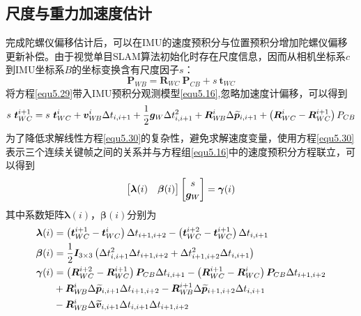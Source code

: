 \subsection{尺度与重力加速度估计}
完成陀螺仪偏移估计后，可以在IMU的速度预积分与位置预积分增加陀螺仪偏移更新补偿。由于视觉单目SLAM算法初始化时存在尺度信息，因而从相机坐标系$c$到IMU坐标系$B$的坐标变换含有尺度因子$s$：
\begin{equation}
\label{equ5.29}
\boldsymbol{P}_{W\!B} = \boldsymbol{R}_{WC}\ \boldsymbol{P}_{CB} + s\ \boldsymbol{t}_{WC} 
\end{equation}
将方程\eqref{equ5.29}带入IMU预积分观测模型\eqref{equ5.16},忽略加速度计偏移，可以得到
\begin{equation}
\label{equ5.30}
s\ \boldsymbol{t}_{WC}^{i+1} = s\ \boldsymbol{t}_{WC}^i + \boldsymbol{v}_{W\!B}^i \Delta t_{i,i+1}+{1 \over 2} \boldsymbol{g}_W \Delta t_{i,i+1}^2 + \boldsymbol{R}_{W\!B}^i \Delta  \widetilde{\boldsymbol{p}}_{i,i+1} + \left(\boldsymbol{R}_{WC}^i-\boldsymbol{R}_{WC}^{i+1} \right) P_{CB}
\end{equation}
为了降低求解线性方程\eqref{equ5.30}的复杂性，避免求解速度变量，使用方程\eqref{equ5.30}表示三个连续关键帧之间的关系并与方程组\eqref{equ5.16}中的速度预积分方程联立，可以得到
\begin{equation}
\label{equ5.31} 
\begin{bmatrix}
\boldsymbol{\lambda}(i) & \boldsymbol{\beta}(i) \cr 
\end{bmatrix} 
\begin{bmatrix}
s \cr
\boldsymbol{g}_W \cr
\end{bmatrix}
= \boldsymbol{\gamma}(i)
\end{equation}
其中系数矩阵$\boldsymbol{\lambda}(i)$，$\boldsymbol{\beta}(i)$分别为
\begin{equation}
\label{equ5.32}
\begin{aligned}
\boldsymbol{\lambda}(i) &= \left( \boldsymbol{t}_{WC}^{i+1}-\boldsymbol{t}_{WC}^i \right) \Delta t_{i+1,i+2} - \left( \boldsymbol{t}_{WC}^{i+2}-\boldsymbol{t}_{WC}^{i+1} \right)\Delta t_{i,i+1} 
\\ 
\boldsymbol{\beta} (i) &= {1 \over 2} \boldsymbol{I}_{3 \times 3} \left( \Delta t_{i,i+1}^2 \Delta t_{i+1,i+2} + \Delta t_{i+1,i+2}^2 \Delta t_{i,i+1} \right) 
\\ 
\boldsymbol{\gamma} (i) &=  \left( \boldsymbol{R}_{WC}^{i+2} - \boldsymbol{R}_{WC}^{i+1} \right) \boldsymbol{P}_{CB} \Delta t_{i,i+1} - \left( \boldsymbol{R}_{WC}^{i+1} - \boldsymbol{R}_{WC}^{i} \right) \boldsymbol{P}_{CB} \Delta t_{i+1,i+2}  \\ 
& + \boldsymbol{R}_{W\!B}^{i} \Delta \widetilde{\boldsymbol{p}}_{i,i+1} \Delta t_{i+1,i+2} - \boldsymbol{R}_{W\!B}^{i+1} \Delta \widetilde{\boldsymbol{p}}_{i+1,i+2} \Delta t_{i,i+1} 			
\\
& - \boldsymbol{R}_{W\!B}^{i} \Delta \widetilde{\boldsymbol{v}}_{i,i+1} \Delta t_{i,i+1} \Delta t_{i+1,i+2}
\end{aligned}
\end{equation}
